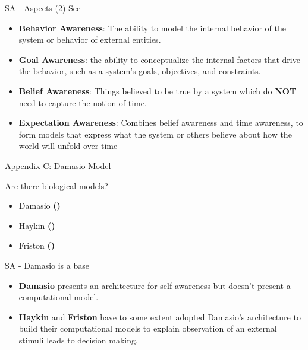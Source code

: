 \documentclass[unknownkeysallowed]{beamer}
\begin{document}
\begin{frame}{SA - Aspects (2)}
	See \textbf{\cite{lewis-2017-towards-a-framework-for-the-levels-and-aspects-of-self-aware-computing-systems}}
	\begin{itemize}
	\item \textbf{Behavior Awareness}: The ability to model the internal behavior of the system
	or behavior of external entities.
	\item \textbf{Goal Awareness}: the ability to conceptualize the internal factors that drive the behavior, such as a system’s goals, objectives, and constraints.
	\item \textbf{Belief Awareness}: Things believed to be true by a system which do \textbf{NOT} need to capture the notion of time.
	\item \textbf{Expectation Awareness}: Combines belief awareness and time awareness, to form models that express what the system or others believe about how the world will unfold over time
	\end{itemize}
\end{frame}

\begin{frame}{Appendix C: Damasio Model}
	
\end{frame}

\begin{frame}{Are there biological models?}
	\begin{itemize}
		\item Damasio \textbf{(\cite{damasio-1999-the-feeling-of-what-happens-body-and-emotion-in-the-making-of-consciousness})}
		\item Haykin \textbf{(\cite{haykin-2012-cognitive-dynamic-systems-perception-action-cycle-radar-and-radio})}
		\item Friston \textbf{(\cite{friston-2010-the-free-energy-principle-a-unified-brain-theory})}
	\end{itemize}
\end{frame}

\begin{frame}{SA - Damasio is a base}
	\begin{itemize}
		\item \textbf{Damasio} presents an architecture for self-awareness but doesn't present a computational model.
		\item \textbf{Haykin} and \textbf{Friston} have to some extent adopted Damasio's architecture to build their computational models to explain observation of an external stimuli leads to decision making. 
	\end{itemize}
\end{frame}
\end{document}
